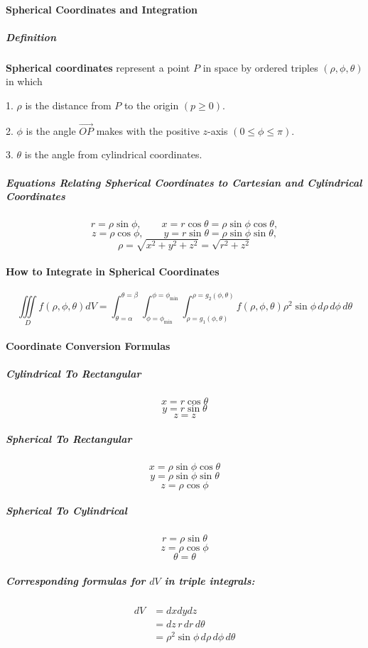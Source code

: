 \documentclass{article}
\begin{document}
            \paragraph{Spherical Coordinates and Integration}
                \subparagraph{Definition} \textbf{Spherical coordinates} represent a point $P$ in space by ordered triples $(\rho,\phi,\theta)$ in which
                \par 1. $\rho$ is the distance from $P$ to the origin $(p\ge 0)$.
                \par 2. $\phi$ is the angle $\overrightarrow{OP}$ makes with the positive $z$-axis $(0\le\phi\le\pi)$.
                \par 3. $\theta$ is the angle from cylindrical coordinates.

                \subparagraph{Equations Relating Spherical  Coordinates to Cartesian and Cylindrical Coordinates}
                \[r=\rho\sin\phi,\qquad x=r\cos\theta=\rho\sin\phi\cos\theta,\]
                \[z=\rho\cos\phi,\qquad y=r\sin\theta=\rho\sin\phi\sin\theta,\]
                \[\rho=\sqrt{x^2+y^2+z^2}=\sqrt{r^2+z^2}\]
            \paragraph{How to Integrate in Spherical Coordinates}
                \[\iiint\limits_Df(\rho,\phi,\theta)dV=\int_{\theta=\alpha}^{\theta=\beta}\int_{\phi=\phi_\text{min}}^{\phi=\phi_\text{min}}\int_{\rho=g_1(\phi,\theta)}^{\rho=g_2(\phi,\theta)}f(\rho,\phi,\theta)\rho^2\sin\phi\,d\rho\, d\phi\, d\theta\]
            \paragraph{Coordinate Conversion Formulas}
                \subparagraph{Cylindrical To Rectangular}
                \[x=r\cos\theta\]
                \[y=r\sin\theta\]
                \[z=z\]
                \subparagraph{Spherical To Rectangular}
                \[x=\rho\sin\phi\cos\theta\]
                \[y=\rho\sin\phi\sin\theta\]
                \[z=\rho\cos\phi\]
                \subparagraph{Spherical To Cylindrical}
                \[r=\rho\sin\theta\]
                \[z=\rho\cos\phi\]
                \[\theta=\theta\]
                \subparagraph{Corresponding formulas for $dV$ in triple integrals:}
                \begin{equation}
                    \begin{aligned}
                        dV&=dxdydz\\
                        &=dz\, r\,dr\,d\theta\\
                        &=\rho^2\sin\phi\,d\rho\,d\phi\,d\theta\\
                    \end{aligned}
                \end{equation}
\end{document}
